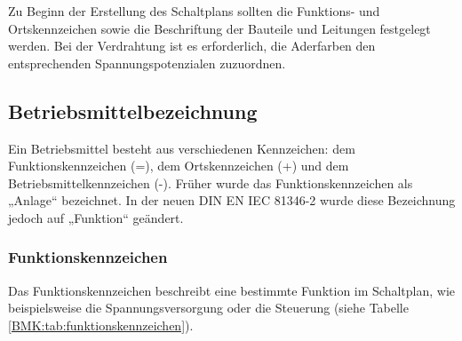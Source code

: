 


Zu Beginn der Erstellung des Schaltplans sollten die Funktions- und Ortskennzeichen sowie die Beschriftung der Bauteile und Leitungen festgelegt werden. Bei der Verdrahtung ist es erforderlich, die Aderfarben den entsprechenden Spannungspotenzialen zuzuordnen.

\subsection{Betriebsmittelbezeichnung}
\label{Schaltplan:BMK}

Ein Betriebsmittel besteht aus verschiedenen Kennzeichen: dem Funktionskennzeichen (=), dem Ortskennzeichen (+) und dem Betriebsmittelkennzeichen (-). Früher wurde das Funktionskennzeichen als „Anlage“ bezeichnet. In der neuen DIN EN IEC 81346-2 \cite{DIN_EN_IEC_81346-2} wurde diese Bezeichnung jedoch auf „Funktion“ geändert.

\subsubsection{Funktionskennzeichen}
Das Funktionskennzeichen beschreibt eine bestimmte Funktion im Schaltplan, wie beispielsweise die Spannungsversorgung oder die Steuerung (siehe Tabelle \ref{BMK:tab:funktionskennzeichen}).

